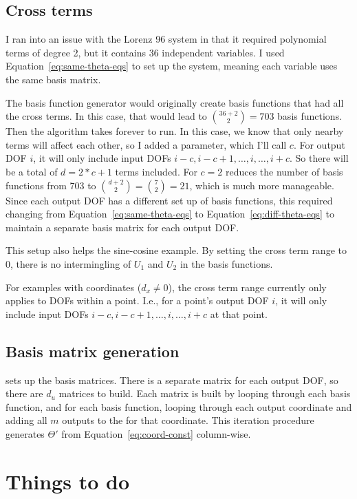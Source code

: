 \documentclass{article}
\def\lstinline#1{}%
\begin{document}
\subsection{Cross terms}
I ran into an issue with the Lorenz 96 system in that it required polynomial
terms of degree 2, but it contains 36 independent variables. I used
Equation~\ref{eq:same-theta-eqs} to set up the system, meaning each variable
uses the same basis matrix.

The basis function generator would originally create basis functions that had
all the cross terms. In this case, that would lead to $\binom{36 + 2}{2} = 703$
basis functions. Then the algorithm takes forever to run. In this case, we know
that only nearby terms will affect each other, so I added a
\lstinline{cross_term_range} parameter, which I'll call $c$. For output DOF $i$,
it will only include input DOFs $i-c,i-c+1,\hdots,i,\hdots,i+c$. So there will
be a total of $d = 2*c+1$ terms included. For $c=2$ reduces the number of basis
functions from 703 to $\binom{d+2}{2} = \binom{7}{2} = 21$, which is much more
manageable. Since each output DOF has a different set up of basis functions,
this required changing from Equation~\ref{eq:same-theta-eqs} to
Equation~\ref{eq:diff-theta-eqs} to maintain a separate basis matrix for each
output DOF.

This setup also helps the sine-cosine example. By setting the cross term range
to 0, there is no intermingling of $U_1$ and $U_2$ in the basis functions.

For examples with coordinates ($d_x \ne 0$), the cross term range currently only
applies to DOFs within a point. I.e., for a point's output DOF $i$, it will only
include input DOFs $i-c,i-c+1,\hdots,i,\hdots,i+c$ at that point.

\subsection{Basis matrix generation}

\lstinline{SINDyBasisAddVariables} sets up the basis matrices. There is a
separate matrix for each output DOF, so there are $d_u$ matrices to build.
Each matrix is built by looping through each basis function, and for each basis function,
looping through each output coordinate and adding all $m$ outputs to the for that coordinate.
This iteration procedure generates $\Theta'$ from Equation~\ref{eq:coord-const} column-wise.


\section{Things to do}
\end{document}
